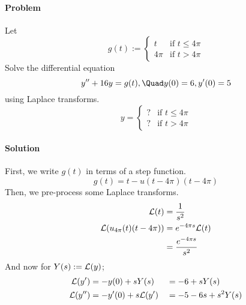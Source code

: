 \newpage\paragraph{Problem}
Let
$$
	g(t):=\begin{cases}
		t    & \text{if }t\leq4\pi \\
		4\pi & \text{if }t>4\pi
	\end{cases}
$$
Solve the differential equation
$$
	y'' + 16y = g(t),\Quad y(0)=6,y'(0)=5
$$
using Laplace transforms.
$$
	y=\begin{cases}
		? & \text{if }t\leq4\pi \\
		? & \text{if }t>4\pi
	\end{cases}
$$

\paragraph{Solution}

First, we write $g(t)$ in terms of a step function.
$$
	g(t) = t - u(t-4\pi)(t-4\pi)
$$
Then, we pre-process some Laplace transforms.
\begin{align*}
	\mathcal L(t)                   & = \frac1{s^2}             \\
	\mathcal L(u_{4\pi}(t)(t-4\pi)) & = e^{-4\pi s}\mathcal L(t)        \\
	                        & = \frac{e^{-4\pi s}}{s^2}
\end{align*}
And now for $Y(s):=\mathcal L(y)$;
\begin{alignat*}{2}
	\mathcal L(y')  & = -y(0)+sY(s)    &  & = -6+sY(s)      \\
	\mathcal L(y'') & = -y'(0)+s\mathcal L(y') &  & = -5-6s+s^2Y(s) \\
\end{alignat*}

